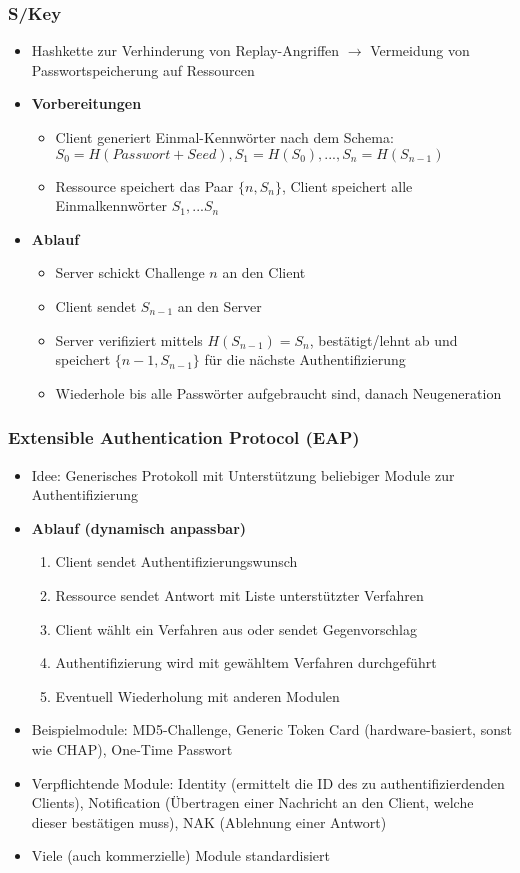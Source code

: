 \subsubsection{S/Key}
\begin{itemize}
	\item Hashkette zur Verhinderung von Replay-Angriffen \(\rightarrow\) Vermeidung von Passwortspeicherung auf Ressourcen
	\item \textbf{Vorbereitungen}
	\begin{itemize}
		\item Client generiert Einmal-Kennwörter nach dem Schema: \(S_0=H(Passwort+Seed),S_1=H(S_0),...,S_n=H(S_{n-1})\)
		\item Ressource speichert das Paar \(\{n,S_n\}\), Client speichert alle Einmalkennwörter \(S_1,...S_n\)
	\end{itemize}
	\item \textbf{Ablauf}
	\begin{itemize}
		\item Server schickt Challenge \(n\) an den Client
		\item Client sendet \(S_{n-1}\) an den Server
		\item Server verifiziert mittels \(H(S_{n-1})=S_n\), bestätigt/lehnt ab und speichert \(\{n-1,S_{n-1}\}\) für die nächste Authentifizierung
		\item Wiederhole bis alle Passwörter aufgebraucht sind, danach Neugeneration
	\end{itemize}
\end{itemize}

\subsubsection{Extensible Authentication Protocol (EAP)}
\begin{itemize}
	\item Idee: Generisches Protokoll mit Unterstützung beliebiger Module zur Authentifizierung
	\item \textbf{Ablauf (dynamisch anpassbar)}
	\begin{enumerate}
		\item Client sendet Authentifizierungswunsch
		\item Ressource sendet Antwort mit Liste unterstützter Verfahren
		\item Client wählt ein Verfahren aus oder sendet Gegenvorschlag
		\item Authentifizierung wird mit gewähltem Verfahren durchgeführt
		\item Eventuell Wiederholung mit anderen Modulen
	\end{enumerate}
	\item Beispielmodule: MD5-Challenge, Generic Token Card (hardware-basiert, sonst wie CHAP), One-Time Passwort
	\item Verpflichtende Module: Identity (ermittelt die ID des zu authentifizierdenden Clients), Notification (Übertragen einer Nachricht an den Client, welche dieser bestätigen muss), NAK (Ablehnung einer Antwort)
	\item Viele (auch kommerzielle) Module standardisiert
\end{itemize}


